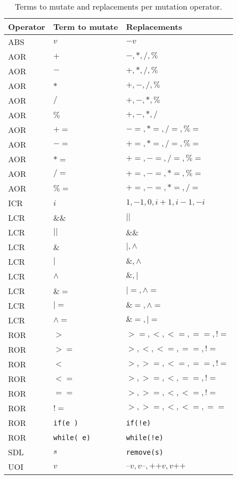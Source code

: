 
\begin{table}[h]
\scriptsize
\centering
\caption{Terms to mutate and replacements per mutation operator.}
\label{table:operators:terms}

\begin{tabular}{lll}
\hline 
\textbf{Operator}	&	\textbf{Term to mutate}	&	\textbf{Replacements}\\
\hline 
ABS	&	$v$	&	$-v$	\\
AOR	&	$+$	&	$ -,*,/,\% $	\\
AOR	&	$-$	&	$ +,*,/,\% $	\\
AOR	&	$*$	&	$ +,-,/,\% $	\\
AOR	&	$/$	&	$ +,-,*,\% $	\\
AOR	&	$\%$	&	$ +,-,*,/ $	\\
AOR	&	$+=$	&	$ -=,*=,/=,\%= $	\\
AOR	&	$-=$	&	$ +=,*=,/=,\%= $	\\
AOR	&	$*=$	&	$ +=,-=,/=,\%= $	\\
AOR	&	$/=$	&	$ +=,-=,*=,\%= $	\\
AOR	&	$\%=$	&	$ +=,-=,*=,/= $	\\
ICR	&	$i$	&	$ 1, -1, 0, i+1, i-1, -i $	\\
LCR	&	$\&\&$	&	$||$	\\
LCR	&	$||$	&	$\&\&$	\\
LCR	&	$\&$	&	$ |,\land $	\\
LCR	&	$|$	&	$ \&,\land $	\\
LCR	&	$\land$	&	$ \&,| $	\\
LCR	&	$\&=$	&	$ |=, \land= $	\\
LCR	&	$|=$	&	$ \&=, \land= $	\\
LCR	&	$\land=$	&	$ \&=, |= $	\\
ROR	&	$>$	&	$ >=, <, <=, ==, != $	\\
ROR	&	$>=$	&	$ >, <, <=, ==, != $	\\
ROR	&	$<$	&	$ >, >=, <=, ==, != $	\\
ROR	&	$<=$	&	$ >, >=, <, ==, != $	\\
ROR	&	$==$	&	$ >, >=, <, <=, != $	\\
ROR	&	$!=$	&	$ >, >=, <, <=, == $	\\
ROR	&	\texttt{if(e )}	&	\texttt{if(!e)}	\\
ROR	&	\texttt{while( e)}	&	\texttt{while(!e)}	\\
SDL	&	$s$	&	\texttt{remove(s)}	\\
UOI	&	$v$	&	$ \texttt{--}v, v\texttt{--}, \texttt{++}v, v\texttt{++} $	\\

\end{tabular}
\end{table}
